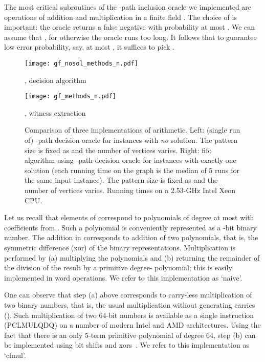 \documentclass[11pt]{article}
\begin{document}
The most critical subroutines of the -path inclusion oracle we implemented are operations of addition and multiplication in a finite field . The choice of  is important: the oracle returns a false negative with probability at most .
We can assume that , for otherwise the oracle runs too long. It follows that to guarantee low error probability, say, at most , 
it suffices to pick . 

\begin{figure}[t]
\begin{minipage}[b]{0.5\linewidth}
\centering
\texttt{[image: gf\_nosol\_methods\_n.pdf]}

{\small , decision algorithm}
\end{minipage}
\begin{minipage}[b]{0.5\linewidth}
\centering
\texttt{[image: gf\_methods\_n.pdf]}

{\small , witness extraction}
\end{minipage}
\caption{\label{fig:gf-impl}Comparison of three implementations of  arithmetic.
Left: (single run of) -path decision oracle for instances with {\em no} solution. The pattern size is fixed as  and the number of vertices  varies.
Right: fifo algorithm using -path decision oracle for instances with exactly one solution (each running time on the graph is the median of 5 runs for the same input instance). 
The pattern size is fixed as  and the number of vertices  varies.
Running times on a 2.53-GHz Intel Xeon CPU.
}
\end{figure}


Let us recall that elements of  correspond to polynomials of degree at most  with coefficients from .
Such a polynomial is conveniently represented as a -bit binary number.
The addition in  corresponds to addition of two polynomials, that is, the symmetric difference (xor) of the binary representations. Multiplication is performed by (a) multiplying the polynomials and (b) returning the remainder of the division of the result by a primitive degree- polynomial; this is easily implemented in  word operations. We refer to this implementation as `naive'.

One can observe that step (a) above corresponds to carry-less multiplication of two binary numbers, that is, the usual multiplication without generating carries (). Such multiplication of two 64-bit numbers is available as a single instruction (PCLMULQDQ) on a number of modern Intel and AMD architectures. Using the fact that there is an only 5-term primitive polynomial of degree 64, step (b) can be implemented using bit shifts and xors~\cite{gueron2010efficient}. We refer to this implementation as `clmul'.
\end{document}
